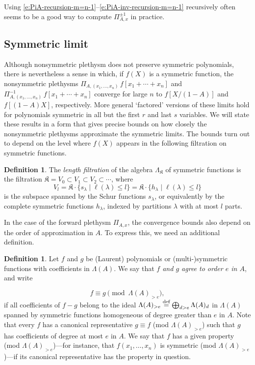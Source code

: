 \documentclass[12pt]{amsart}
\theoremstyle{definition}
\newtheorem{defn}[thm]{Definition}
\theoremstyle{remark}
\newcommand{\multisymmetric}{(multi\mbox{-})symmetric }
\newcommand{\Kfrak}{{\mathfrak K}}
\newcommand{\defeq}{\mathrel{\overset{\text{{\rm def}}}{=}}}
\begin{document}
Using \eqref{e:PiA-recursion-m=n-1}--\eqref{e:PiA-inv-recursion-m=n-1}
recursively often seems to be a good way to compute $\Pi _{A,x}^{\pm
1}$ in practice.


\subsection{Symmetric limit}
\label{ss:symmetric-limit}

Although nonsymmetric plethysm does not preserve symmetric
polynomials, there is nevertheless a sense in which, if $f(X)$ is a
symmetric function, the nonsymmetric plethysms $\Pi
_{A,(x_{1},\ldots,x_{n})}\, f[x_{1}+\cdots + x_{n}]$ and $\Pi
_{A,(x_{1},\ldots,x_{n})}^{-1}\, f[x_{1}+\cdots + x_{n}]$ converge for
large $n$ to $f[X/(1-A)]$ and $f[(1-A)X]$, respectively.  More general
`factored' versions of these limits hold for polynomials symmetric in
all but the first $r$ and last $s$ variables.  We will state these
results in a form that gives precise bounds on how closely the
nonsymmetric plethysms approximate the symmetric limits.  The bounds
turn out to depend on the level where $f(X)$ appears in the following
filtration on symmetric functions.

\begin{defn}\label{def:Vl}
The {\em length filtration} of the algebra $\Lambda _{\Kfrak }$ of
symmetric functions is the filtration $\Kfrak = V_{0} \subset V_{1}
\subset V_{2} \subset \cdots $, where
\begin{equation}\label{e:Vl}
V_{l} = \Kfrak \cdot \{s_{\lambda } \mid \ell (\lambda )\leq l \} =
\Kfrak \cdot \{h_{\lambda } \mid \ell (\lambda )\leq l \}
\end{equation}
is the subspace spanned by the Schur functions $s_{\lambda }$, or
equivalently by the complete symmetric functions $h_{\lambda }$,
indexed by partitions $\lambda $ with at most $l$ parts.
\end{defn}

In the case of the forward plethysm $\Pi _{A,x}$, the convergence
bounds also depend on the order of approximation in $A$.  To express
this, we need an additional definition.

\begin{defn}\label{def:Lambda>e}
Let $f$ and $g$ be (Laurent) polynomials or \multisymmetric
functions with coefficients in $\Lambda (A)$.  We say that {\em $f$
and $g$ agree to order $e$ in $A$}, and write

\begin{equation}\label{e:Lambda>e}
f \equiv g \pmod{\Lambda (A)_{>e}},
\end{equation}
if all coefficients of $f-g$ belong to the ideal $\Lambda (A) _{>e} \defeq
\bigoplus _{d>e} \Lambda (A)_{d}$ in $\Lambda (A)$ spanned by
symmetric functions homogeneous of degree greater than $e$ in $A$.
Note that every $f$ has a canonical representative $g\equiv f$ (mod
$\Lambda (A) _{>e}$) such that $g$ has coefficients of degree at most
$e$ in $A$.  We say that $f$ has a given property (mod $\Lambda(A)
_{>e}$)---for instance, that $f(x_{1},\ldots,x_{n})$ is symmetric
(mod $\Lambda(A) _{>e}$)---if its canonical representative has the
property in question.
\end{defn}
\end{document}
